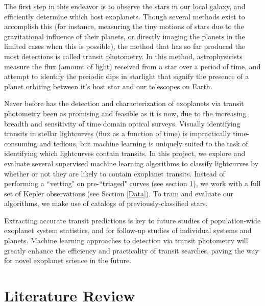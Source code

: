 \documentclass{article}
\begin{document}
The first step in this endeavor is to observe the stars in our local galaxy, and efficiently determine which host exoplanets. Though several methods exist to accomplish this (for instance, measuring the tiny motions of stars due to the gravitational influence of their planets, or directly imaging the planets in the limited cases when this is possible), the method that has so far produced the most detections is called transit photometry. In this method, astrophysicists measure the flux (amount of light) received from a star over a period of time, and attempt to identify the periodic dips in starlight that signify the presence of a planet orbiting between it's host star and our telescopes on Earth.

Never before has the detection and characterization of exoplanets via transit photometry been as promising and feasible as it is now, due to the increasing breadth and sensitivity of time domain optical surveys. Visually identifying transits in stellar lightcurves (flux as a function of time) is impractically time-consuming and tedious, but machine learning is uniquely suited to the task of identifying which lightcurves contain transits. In this project, we explore and evaluate several supervised machine learning algorithms to classify lightcurves by whether or not they are likely to contain exoplanet transits. Instead of performing a ``vetting" on pre-``triaged" curves (see section \ref{sec:lit_rev}), we work with a full set of Kepler observations (see Section \ref{Data}). To train and evaluate our algorithms, we make use of catalogs of previously-classified stars. 

Extracting accurate transit predictions is key to future studies of population-wide exoplanet system statistics, and for follow-up studies of individual systems and planets. Machine learning approaches to detection via transit photometry will greatly enhance the efficiency and practicality of transit searches, paving the way for novel exoplanet science in the future. 

\section{Literature Review}\label{sec:lit_rev}
\end{document}
